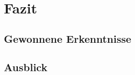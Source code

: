 \chapter{Fazit}\label{ch:fazit}
\section{Gewonnene Erkenntnisse}\label{sec:gewonnene-erkenntnisse}
\section{Ausblick}\label{sec:ausblick}